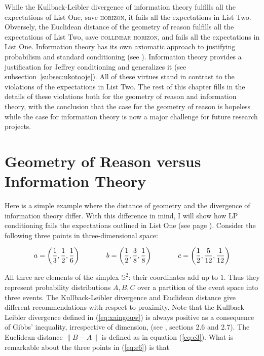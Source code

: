\documentclass[phd,12pt,oneside]{ubcthesis}
\begin{document}
While the Kullback-Leibler divergence of information theory fulfills
all the expectations of List One, save \textsc{horizon}, it fails all
the expectations in List Two. Obversely, the Euclidean distance of the
geometry of reason fulfills all the expectations of List Two, save
\textsc{collinear horizon}, and fails all the expectations in List
One. Information theory has its own axiomatic approach to justifying
probabilism and standard conditioning (see
). Information theory provides a
justification for Jeffrey conditioning and generalizes it (see
subsection~\ref{subsec:ukotooje}). All of these virtues stand in
contrast to the violations of the expectations in List Two. The rest
of this chapter fills in the details of these violations both for the
geometry of reason and information theory, with the conclusion that
the case for the geometry of reason is hopeless while the case for
information theory is now a major challenge for future research
projects.

\section{Geometry of Reason versus Information Theory}
\label{sec:shahseid}

Here is a simple example where the distance of geometry and the
divergence of information theory differ. With this difference in mind,
I will show how LP conditioning fails the expectations outlined in
List One (see page \pageref{page:listone}). Consider the following three
points in three-dimensional space:

\begin{equation}
  \label{eq:e6}
    a=\left(\frac{1}{3},\frac{1}{2},\frac{1}{6}\right) \hspace{.5in}
    b=\left(\frac{1}{2},\frac{3}{8},\frac{1}{8}\right)  \hspace{.5in}
    c=\left(\frac{1}{2},\frac{5}{12},\frac{1}{12}\right)
\end{equation}

All three are elements of the simplex $\mathbb{S}^{2}$: their
coordinates add up to $1$. Thus they represent probability
distributions $A,B,C$ over a partition of the event space into three
events. The Kullback-Leibler divergence and Euclidean distance give
different re\-commendations with respect to proximity. Note that the
Kullback-Leibler divergence defined in (\ref{eq:xaingouw}) is always
positive as a consequence of Gibbs' inequality, irrespective of
dimension, (see , sections 2.6 and 2.7). The
Euclidean distance $\|B-A\|$ is defined as in equation (\ref{eq:e3}).
What is remarkable about the three points in (\ref{eq:e6}) is that
\end{document}
